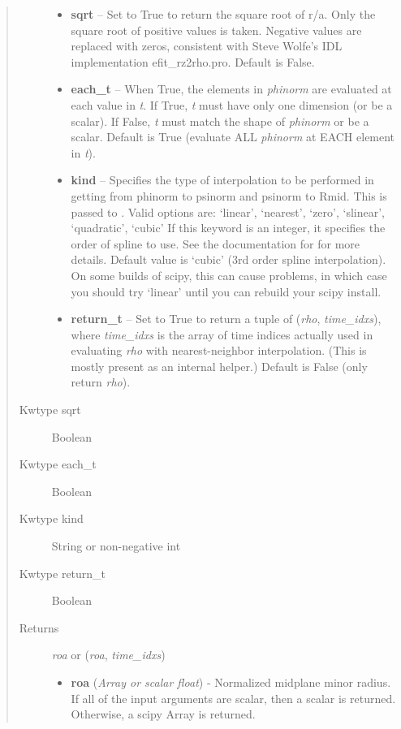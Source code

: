 \documentclass[letterpaper,10pt,english]{sphinxmanual}
\begin{document}
\begin{fulllineitems}
\begin{fulllineitems}
\begin{quote}
\begin{description}
\begin{itemize}
\item {} 
\textbf{sqrt} -- Set to True to return the square root of r/a.
Only the square root of positive values is taken. Negative
values are replaced with zeros, consistent with Steve Wolfe's
IDL implementation efit\_rz2rho.pro. Default is False.

\item {} 
\textbf{each\_t} -- When True, the elements in \emph{phinorm} are evaluated
at each value in \emph{t}. If True, \emph{t} must have only one dimension
(or be a scalar). If False, \emph{t} must match the shape of \emph{phinorm}
or be a scalar. Default is True (evaluate ALL \emph{phinorm} at EACH
element in \emph{t}).

\item {} 
\textbf{kind} -- Specifies the type of
interpolation to be performed in getting from phinorm to
psinorm and psinorm to Rmid. This is passed to
. Valid options are:
`linear', `nearest', `zero', `slinear', `quadratic', `cubic'
If this keyword is an integer, it specifies the order of spline
to use. See the documentation for  for more
details. Default value is `cubic' (3rd order spline
interpolation). On some builds of scipy, this can cause problems,
in which case you should try `linear' until you can rebuild your
scipy install.

\item {} 
\textbf{return\_t} -- Set to True to return a tuple of (\emph{rho},
\emph{time\_idxs}), where \emph{time\_idxs} is the array of time indices
actually used in evaluating \emph{rho} with nearest-neighbor
interpolation. (This is mostly present as an internal helper.)
Default is False (only return \emph{rho}).

\end{itemize}

\item[{Kwtype sqrt}] \leavevmode
Boolean

\item[{Kwtype each\_t}] \leavevmode
Boolean

\item[{Kwtype kind}] \leavevmode
String or non-negative int

\item[{Kwtype return\_t}] \leavevmode
Boolean

\item[{Returns}] \leavevmode

\emph{roa} or (\emph{roa}, \emph{time\_idxs})
\begin{itemize}
\item {} 
\textbf{roa} (\emph{Array or scalar float}) - Normalized midplane minor
radius. If all of the input arguments are scalar, then a scalar
is returned. Otherwise, a scipy Array is returned.


\end{itemize}
\end{description}
\end{quote}
\end{fulllineitems}
\end{fulllineitems}
\end{document}
